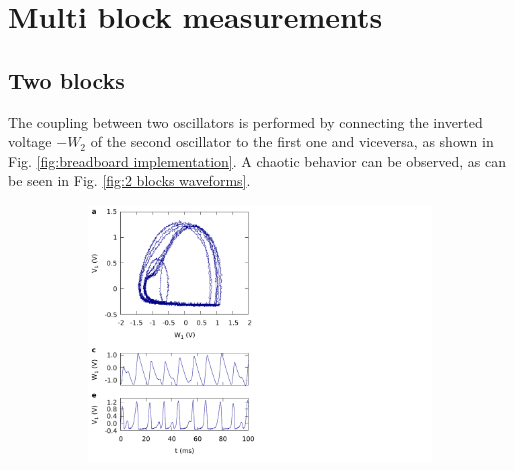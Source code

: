 \documentclass[a4paper,11pt,aps,secnumarabic,balancelastpage,amsmath,amssymb,floatfix,table]{article}
\begin{document}
\clearpage

\section{Multi block measurements}

\subsection{Two blocks}

The coupling between two oscillators is performed by connecting
the inverted voltage $-W_2$ of the second oscillator to the
first one and viceversa, as shown in Fig.
\ref{fig:breadboard implementation}. A chaotic behavior can be observed,
as can be seen in Fig. \ref{fig:2 blocks waveforms}.


\begin{figure}[H]
    \centering
    \begin{minipage}{.49\textwidth}
        \begin{subfigure}{\linewidth}
            \centering
            \includegraphics[width=\linewidth,trim={0cm 0 11cm 0},clip,center]
            {../2_blocks/plots/waveforms_1.pdf}
        \end{subfigure}
    \end{minipage}
    \begin{minipage}{.49\textwidth}
        \begin{subfigure}{\linewidth}
            \centering

\end{subfigure}
\end{minipage}
\end{figure}
\end{document}
